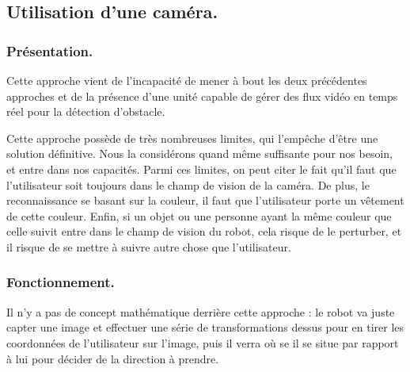 \documentclass{article}
\begin{document}
\subsection{Utilisation d'une caméra.}
\subsubsection{Présentation.}
Cette approche vient de l'incapacité de mener à bout les deux précédentes approches et de la présence d'une unité capable de gérer des flux vidéo en temps réel pour la détection d'obstacle.

Cette approche possède de très nombreuses limites, qui l'empêche d'être une solution définitive. Nous la considérons quand même suffisante pour nos besoin, et entre dans nos capacités. Parmi ces limites, on peut citer le fait qu'il faut que l'utilisateur soit toujours dans le champ de vision de la caméra. De plus, le reconnaissance se basant sur la couleur, il faut que l'utilisateur porte un vêtement de cette couleur. Enfin, si un objet ou une personne ayant la même couleur que celle suivit entre dans le champ de vision du robot, cela risque de le perturber, et il risque de se mettre à suivre autre chose que l'utilisateur.

\subsubsection{Fonctionnement.}
Il n'y a pas de concept mathématique derrière cette approche : le robot va juste capter une image et effectuer une série de transformations dessus pour en tirer les coordonnées de l'utilisateur sur l'image, puis il verra où se il se situe par rapport à lui pour décider de la direction à prendre.
\end{document}
